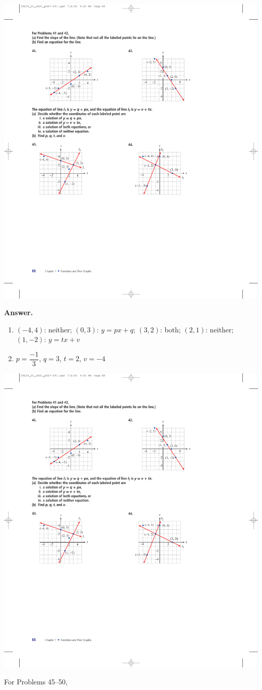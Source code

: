 \documentclass[10pt,]{book}
\theoremstyle{plain}
\theoremstyle{definition}
\theoremstyle{definition}
\theoremstyle{definition}
\theoremstyle{definition}
\numberwithin{equation}{part}
\begin{document}
\begin{exerciselist}
\begin{exercisegroup}
\exercise[43.]\hypertarget{exercise-329}{}\includegraphics[width=0.5\linewidth]{images/fig-ex-1-5-43}
%
\par\smallskip
\noindent\textbf{Answer.}\hypertarget{answer-185}{}\quad
\leavevmode%
\begin{multicols}{2}
\begin{enumerate}[label=*\alph**]
\item\hypertarget{li-1237}{}\((-4, 4)\): neither; \((0, 3)\): \(y = px + q\); \((3, 2)\): both; \((2, 1)\): neither; \((1,-2)\): \(y = tx + v\)%
\item\hypertarget{li-1238}{}\(p =\dfrac{-1}{3}\), \(q = 3\), \(t = 2\), \(v = -4\)%
\end{enumerate}
\end{multicols}
%
\exercise[44.]\hypertarget{exercise-330}{}\includegraphics[width=0.5\linewidth]{images/fig-ex-1-5-44}
%
\end{exercisegroup}
\par\smallskip\noindent
\hypertarget{exercisegroup-43}{}\par\noindent For Problems 45–50, \leavevmode%

\end{exerciselist}
\end{document}

